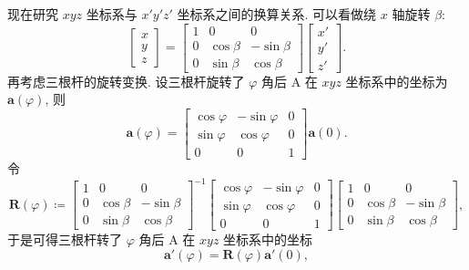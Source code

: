 \documentclass{article}
\begin{document}
现在研究 $xyz$ 坐标系与 $x'y'z'$ 坐标系之间的换算关系.
可以看做绕 $x$ 轴旋转 $\beta$:
\begin{equation}
	\left[\begin{matrix}x\\y\\z\end{matrix}\right]=
	\left[\begin{matrix}1&0&0\\0&\cos\beta&-\sin\beta\\0&\sin\beta&\cos\beta\end{matrix}\right]
	\left[\begin{matrix}x'\\y'\\z'\end{matrix}\right].
\end{equation}
再考虑三根杆的旋转变换.
设三根杆旋转了 $\varphi$ 角后 A 在 $xyz$ 坐标系中的坐标为 $\mathbf a\!\left(\varphi\right)$, 则
\begin{equation}
	\mathbf a\!\left(\varphi\right)=
	\left[\begin{matrix}\cos\varphi&-\sin\varphi&0\\\sin\varphi&\cos\varphi&0\\0&0&1\end{matrix}\right]
	\mathbf a\!\left(0\right).
\end{equation}
令
\begin{equation}
	\mathbf R\!\left(\varphi\right)\coloneqq 
	\left[\begin{matrix}1&0&0\\0&\cos\beta&-\sin\beta\\0&\sin\beta&\cos\beta\end{matrix}\right]^{-1}
	\left[\begin{matrix}\cos\varphi&-\sin\varphi&0\\\sin\varphi&\cos\varphi&0\\0&0&1\end{matrix}\right]
	\left[\begin{matrix}1&0&0\\0&\cos\beta&-\sin\beta\\0&\sin\beta&\cos\beta\end{matrix}\right],
\end{equation}
于是可得三根杆转了 $\varphi$ 角后 A 在 $xyz$ 坐标系中的坐标
\begin{equation}
	\label{eq:a'(phi)未展开}
	\mathbf a'\!\left(\varphi\right)=\mathbf R\!\left(\varphi\right)\mathbf a'\!\left(0\right),
\end{equation}
\end{document}
